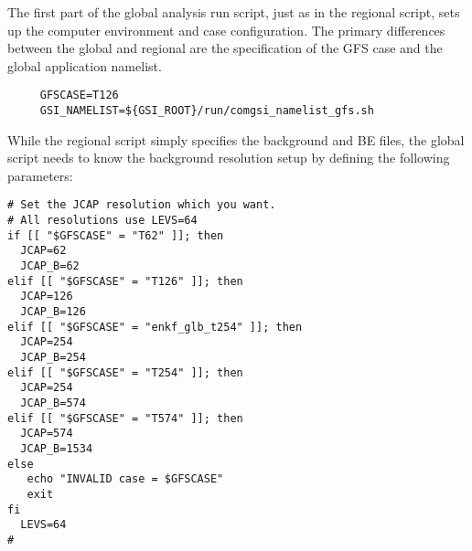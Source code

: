 The first part of the global analysis run script, just as in the regional script, sets up the computer environment and case configuration. The primary 
differences between the global and regional are the specification of the GFS case and the global application namelist.
\begin{small}
\begin{verbatim}
     GFSCASE=T126
     GSI_NAMELIST=${GSI_ROOT}/run/comgsi_namelist_gfs.sh
\end{verbatim}
\end{small}
While the regional script simply specifies the background and BE files, the global script needs to know the background resolution setup by defining the 
following parameters:
\begin{scriptsize}
\begin{verbatim}
# Set the JCAP resolution which you want.
# All resolutions use LEVS=64
if [[ "$GFSCASE" = "T62" ]]; then
  JCAP=62
  JCAP_B=62
elif [[ "$GFSCASE" = "T126" ]]; then
  JCAP=126
  JCAP_B=126
elif [[ "$GFSCASE" = "enkf_glb_t254" ]]; then
  JCAP=254
  JCAP_B=254
elif [[ "$GFSCASE" = "T254" ]]; then
  JCAP=254
  JCAP_B=574
elif [[ "$GFSCASE" = "T574" ]]; then
  JCAP=574
  JCAP_B=1534
else
   echo "INVALID case = $GFSCASE"
   exit
fi
  LEVS=64
#
\end{verbatim}
\end{scriptsize}

